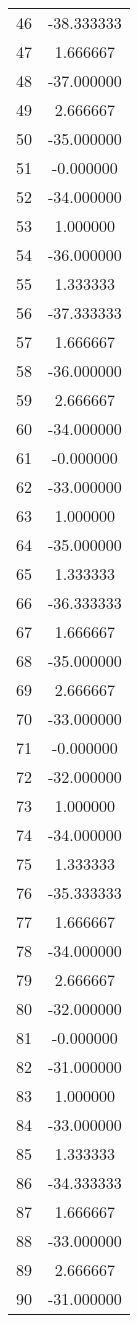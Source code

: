 \documentclass[12pt]{article}
\begin{document}
\begin{longtable}{@{}cc@{}}
46 & -38.333333 \\
47 & 1.666667 \\
48 & -37.000000 \\
49 & 2.666667 \\
50 & -35.000000 \\
51 & -0.000000 \\
52 & -34.000000 \\
53 & 1.000000 \\
54 & -36.000000 \\
55 & 1.333333 \\
56 & -37.333333 \\
57 & 1.666667 \\
58 & -36.000000 \\
59 & 2.666667 \\
60 & -34.000000 \\
61 & -0.000000 \\
62 & -33.000000 \\
63 & 1.000000 \\
64 & -35.000000 \\
65 & 1.333333 \\
66 & -36.333333 \\
67 & 1.666667 \\
68 & -35.000000 \\
69 & 2.666667 \\
70 & -33.000000 \\
71 & -0.000000 \\
72 & -32.000000 \\
73 & 1.000000 \\
74 & -34.000000 \\
75 & 1.333333 \\
76 & -35.333333 \\
77 & 1.666667 \\
78 & -34.000000 \\
79 & 2.666667 \\
80 & -32.000000 \\
81 & -0.000000 \\
82 & -31.000000 \\
83 & 1.000000 \\
84 & -33.000000 \\
85 & 1.333333 \\
86 & -34.333333 \\
87 & 1.666667 \\
88 & -33.000000 \\
89 & 2.666667 \\
90 & -31.000000 \\

\end{longtable}
\end{document}
